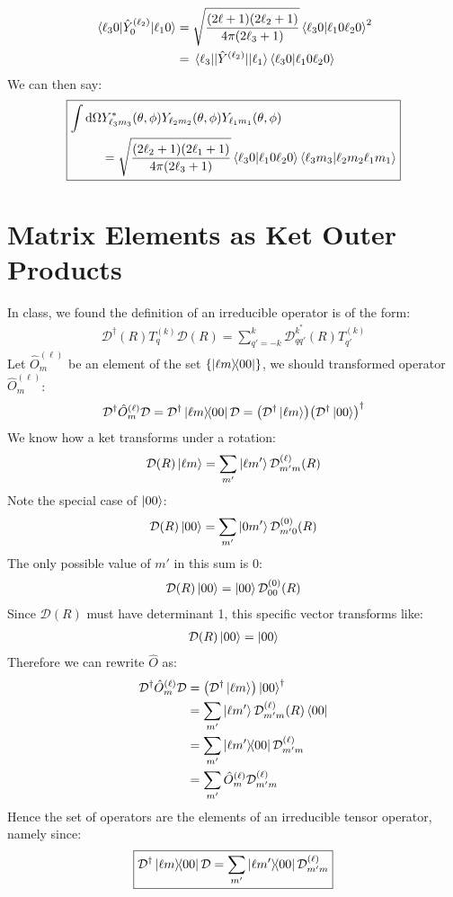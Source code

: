 \documentclass[12pt]{article}
\renewcommand{\l}{\ell}
\newcommand{\cD}{\mathcal{D}}
\begin{document}
\begin{align*}
  \mel{\l_30}{\hat{Y}_0^{(\l_2)}}{\l_10}&=
  \sqrt{\frac{(2\l+1)(2\l_2+1)}{4\pi(2\l_3+1)}}\ip{\l_30}{\l_10\l_20}^2\\
  &=\mel{\l_3}{|\hat{Y}^{(\l_2)}|}{\l_1}\ip{\l_30}{\l_10\l_20}
\end{align*}
We can then say:
\begin{equation}
  \boxed{
  \begin{aligned}
    \int\dd{\Omega}&Y^*_{\l_3m_3}(\theta,\phi)
    Y_{\l_2m_2}(\theta,\phi)Y_{\l_1m_1}(\theta,\phi)\\
    &=\sqrt{\frac{(2\l_2+1)(2\l_1+1)}{4\pi(2\l_3+1)}}\ip{\l_30}{\l_10\l_20}
    \ip{\l_3m_3}{\l_2m_2\l_1m_1}
  \end{aligned}}
\end{equation}
\section{Matrix Elements as Ket Outer Products}
In class, we found the definition of an irreducible operator is of the form:
\begin{align*}
  \cD^\dag(R)T_q^{(k)}\cD(R)=
  \sum_{q'=-k}^k\cD^{k^*}_{qq'}(R)T^{(k)}_{q'}
\end{align*}
Let $\hat{O}^{(\l)}_m$ be an element of the set $\{\dyad{\l m}{00}\}$, we should transformed operator $\hat{O}^{(\l)}_m$:
\begin{align*}
  \cD^\dag\hat{O}^{(\l)}_m\cD=\cD^\dag\dyad{\l m}{00}\cD=
  \qty(\cD^\dag\ket{\l m})\qty(\cD^\dag\ket{00})^\dag
\end{align*}
We know how a ket transforms under a rotation:
\begin{align*}
  \cD(R)\ket{\l m}=\sum_{m'}\ket{\l m'}\cD^{(\l)}_{m'm}(R)
\end{align*}
Note the special case of $\ket{00}$:
\begin{align*}
  \cD(R)\ket{00}=\sum_{m'}\ket{0 m'}\cD^{(0)}_{m'0}(R)
\end{align*}
The only possible value of $m'$ in this sum is 0:
\begin{align*}
  \cD(R)\ket{00}=\ket{0 0}\cD^{(0)}_{00}(R)
\end{align*}
Since $\cD(R)$ must have determinant 1, this specific vector transforms like:
\begin{align*}
  \cD(R)\ket{00}=\ket{0 0}
\end{align*}
Therefore we can rewrite $\hat{O}$ as:
\begin{align*}
  \cD^\dag\hat{O}^{(\l)}_m\cD&=\qty(\cD^\dag\ket{\l m})\ket{00}^\dag\\
  &=\sum_{m'}\ket{\l m'}\cD^{(\l)}_{m'm}(R)\bra{00}\\
  &=\sum_{m'}\dyad{\l m'}{00}\cD^{(\l)}_{m'm}\\
  &=\sum_{m'}\hat{O}^{(\l)}_m\cD^{(\l)}_{m'm}
\end{align*}
Hence the set of operators are the elements of an irreducible tensor operator, namely since:
\begin{align}
  \boxed{\cD^\dag\dyad{\l m}{00}\cD=\sum_{m'}\dyad{\l m'}{00}\cD^{(\l)}_{m'm}}
\end{align}
\end{document}
